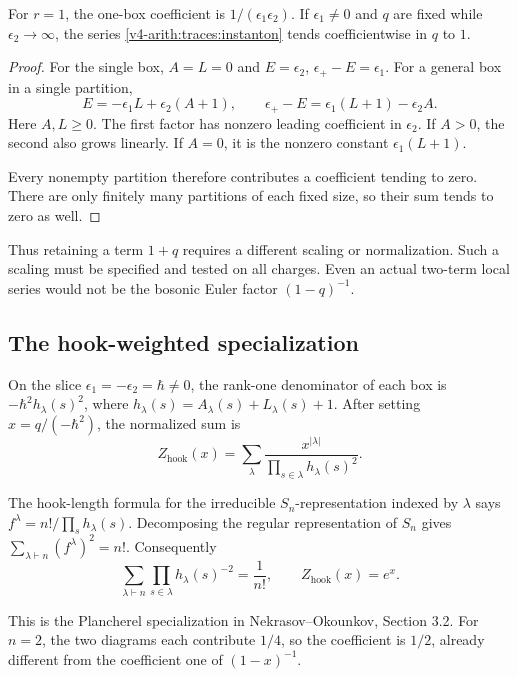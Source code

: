 \begin{proposition}
\label{v4-arith:traces:instanton-limit}
For $r=1$, the one-box coefficient is $1/(\epsilon_1\epsilon_2)$. If
$\epsilon_1\ne0$ and $q$ are fixed while $\epsilon_2\to\infty$, the series
\eqref{v4-arith:traces:instanton} tends coefficientwise in $q$ to $1$.
\end{proposition}
\begin{proof}
For the single box, $A=L=0$ and $E=\epsilon_2$, $\epsilon_+-E=\epsilon_1$.
For a general box in a single partition,
\[
 E=-\epsilon_1L+\epsilon_2(A+1),\qquad
 \epsilon_+-E=\epsilon_1(L+1)-\epsilon_2A.
\]
Here $A,L\geq0$. The first factor has nonzero leading coefficient in
$\epsilon_2$. If $A>0$, the second also grows linearly. If $A=0$, it is the
nonzero constant $\epsilon_1(L+1)$.

Every nonempty partition therefore contributes a coefficient tending to
zero. There are only finitely many partitions of each fixed size, so their
sum tends to zero as well.
\end{proof}

Thus retaining a term $1+q$ requires a different scaling or normalization.
Such a scaling must be specified and tested on all charges. Even an actual
two-term local series would not be the bosonic Euler factor $(1-q)^{-1}$.

\subsection{The hook-weighted specialization}

On the slice $\epsilon_1=-\epsilon_2=\hbar\ne0$, the rank-one denominator of
each box is $-\hbar^2h_\lambda(s)^2$, where
$h_\lambda(s)=A_\lambda(s)+L_\lambda(s)+1$. After setting $x=q/(-\hbar^2)$,
the normalized sum is
\[
 Z_{\mathrm{hook}}(x)
    =\sum_\lambda
        \frac{x^{|\lambda|}}{\prod_{s\in\lambda}h_\lambda(s)^2}.
\]

The hook-length formula for the irreducible $S_n$-representation indexed by
$\lambda$ says $f^\lambda=n!/\prod_s h_\lambda(s)$. Decomposing the regular
representation of $S_n$ gives $\sum_{\lambda\vdash n}(f^\lambda)^2=n!$.
Consequently
\[
 \sum_{\lambda\vdash n}
          \prod_{s\in\lambda}h_\lambda(s)^{-2}
     =\frac1{n!},\qquad
 Z_{\mathrm{hook}}(x)=e^x.
\]

This is the Plancherel specialization in Nekrasov--Okounkov, Section 3.2.
For $n=2$, the two diagrams each contribute $1/4$, so the coefficient is
$1/2$, already different from the coefficient one of $(1-x)^{-1}$.

